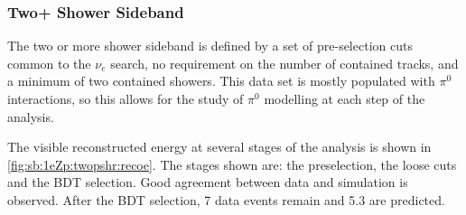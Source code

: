 \subsubsection{Two+ Shower Sideband}
\label{sec:sideband:1e0p:2pshr}

The two or more shower sideband is defined by a set of pre-selection cuts common to the $\nu_e$ search, no requirement on the number of contained tracks, and a minimum of two contained showers. This data set is mostly populated with $\pi^0$ interactions, so this allows for the study of $\pi^0$ modelling at each step of the analysis.

The visible reconstructed energy at several stages of the analysis is shown in \cref{fig:sb:1eZp:twopshr:recoe}. The stages shown are: the \zpsel preselection, the \zpsel loose cuts and the \zpsel BDT selection. Good agreement between data and simulation is observed. After the BDT selection, 7 data events remain and 5.3 are predicted.

